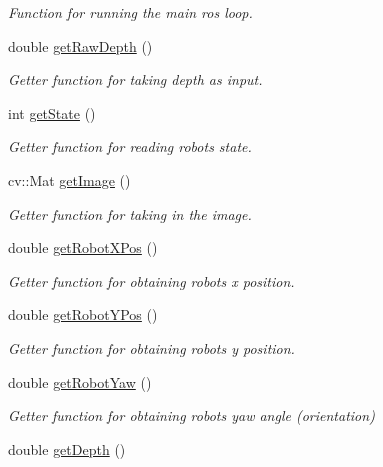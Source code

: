 \begin{DoxyCompactItemize}
\begin{DoxyCompactList}\small\item\em Function for running the main ros loop. \end{DoxyCompactList}\item 
double \hyperlink{classStateMachine_a4bdbecd6cf56fb8fff20c7e0232dd33b}{get\+Raw\+Depth} ()
\begin{DoxyCompactList}\small\item\em Getter function for taking depth as input. \end{DoxyCompactList}\item 
int \hyperlink{classStateMachine_ae386ede5033e27c114e88bdd830a6ff2}{get\+State} ()
\begin{DoxyCompactList}\small\item\em Getter function for reading robot\textquotesingle{}s state. \end{DoxyCompactList}\item 
cv\+::\+Mat \hyperlink{classStateMachine_a3f545ec499f6136057d9ecf44663d3a3}{get\+Image} ()
\begin{DoxyCompactList}\small\item\em Getter function for taking in the image. \end{DoxyCompactList}\item 
double \hyperlink{classStateMachine_a99887795ff6b06f6002779f72928d330}{get\+Robot\+X\+Pos} ()
\begin{DoxyCompactList}\small\item\em Getter function for obtaining robot\textquotesingle{}s x position. \end{DoxyCompactList}\item 
double \hyperlink{classStateMachine_a4bc3adc3985724e42ab8509457b59ad0}{get\+Robot\+Y\+Pos} ()
\begin{DoxyCompactList}\small\item\em Getter function for obtaining robot\textquotesingle{}s y position. \end{DoxyCompactList}\item 
double \hyperlink{classStateMachine_ab9c545cbbf1ccae25a4c68e4d1323751}{get\+Robot\+Yaw} ()
\begin{DoxyCompactList}\small\item\em Getter function for obtaining robot\textquotesingle{}s yaw angle (orientation) \end{DoxyCompactList}\item 
double \hyperlink{classStateMachine_a82c53e5941ba7b2b96eff859bbf9d754}{get\+Depth} ()

\end{DoxyCompactItemize}
